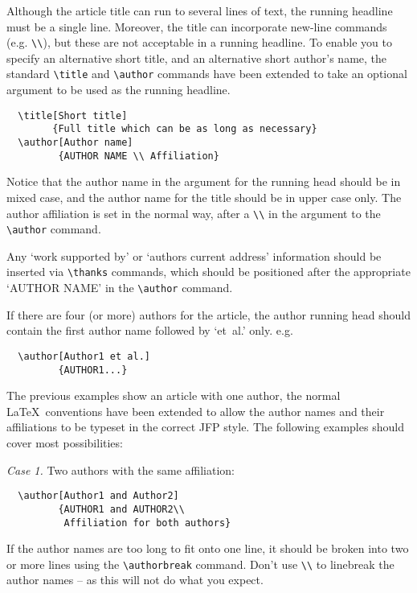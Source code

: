 \documentclass{jfp1}
\begin{document}
Although the article title can run to several lines of text, the running
headline must be a single line. Moreover, the title can incorporate new-line
commands (e.g. \verb"\\"), but these are not acceptable in a running headline.
To enable you to specify an alternative short title, and an alternative short
author's name, the standard \verb"\title" and \verb"\author" commands have
been extended to take an optional argument to be used as the running headline.
%
\begin{verbatim}
  \title[Short title]
        {Full title which can be as long as necessary}
  \author[Author name]
         {AUTHOR NAME \\ Affiliation}
\end{verbatim}
%
Notice that the author name in the argument for the running head should
be in mixed case, and the author name for the title should be in upper
case only. The author affiliation is set in the normal way, after a
\verb"\\" in the argument to the \verb"\author" command.

Any `work supported by' or `authors current address' information should
be inserted via \verb"\thanks" commands, which should be positioned
after the appropriate `AUTHOR NAME' in the \verb"\author" command.

If there are four (or more) authors for the article, the author running head
should contain the first author name followed by `et~al.' only. e.g.
%
\begin{verbatim}
  \author[Author1 et al.]
         {AUTHOR1...}
\end{verbatim}

The previous examples show an article with one author, the normal
\LaTeX\ conventions have been extended to allow the author names and
their affiliations to be typeset in the correct JFP style. The following
examples should cover most possibilities:

\textit{Case 1.} Two authors with the same affiliation:
%
\begin{verbatim}
  \author[Author1 and Author2]
         {AUTHOR1 and AUTHOR2\\
          Affiliation for both authors}
\end{verbatim}
%
If the author names are too long to fit onto one line, it should be
broken into two or more lines using the \verb"\authorbreak" command.
Don't use \verb"\\" to linebreak the author names -- as this will not do what
you expect.
\end{document}
